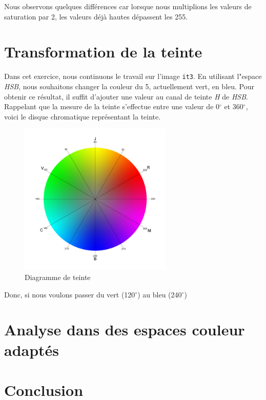 \documentclass[a4paper,11pt]{article}
\begin{document}
Nous observons quelques différences car lorsque nous multiplions les 
valeurs de saturation par 2, les valeurs déjà hautes dépassent les 255.

\section{Transformation de la teinte}

Dans cet exercice, nous continuons le travail sur l'image \texttt{it3}. 
En utilisant l"espace \textit{HSB}, nous souhaitons changer la couleur 
du 5, actuellement vert, en bleu. Pour obtenir ce résultat, il suffit 
d'ajouter une valeur au canal de teinte \textit{H} de \textit{HSB}. 
Rappelant que la mesure de la teinte s'effectue entre une valeur de 
0$^{\circ}$ et 360$^{\circ}$, voici le disque chromatique représentant la teinte.\\

\begin{figure}[H]
  \begin{center}
    \includegraphics[width=275px]{images/disque_chr.png}
    \caption{Diagramme de teinte}
  \end{center}
\end{figure}

Donc, si nous voulons passer du vert (120$^{\circ}$) au bleu 
(240$^{\circ}$)

\section{Analyse dans des espaces couleur adaptés}

\section*{Conclusion}
\end{document}
